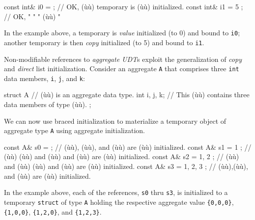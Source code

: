 \begin{emcppslisting}
const int& i0 = { };    // OK, (ù{}ù) temporary is (ù{}ù) initialized.
const int& i1 = { 5 };  // OK,       "           "       " (ù{}ù)      "
\end{emcppslisting}


\noindent In the example above, a temporary is \emph{value} initialized (to 0) and
bound to \lstinline!i0!; another temporary is then \emph{copy} initialized
(to 5) and bound to \lstinline!i1!.

Non-modifiable references to \emph{aggregate UDT}s exploit the
generalization of \emph{copy} and \emph{direct} list initialization.
Consider an aggregate \lstinline!A! that comprises three \lstinline!int! data
members, \lstinline!i!, \lstinline!j!, and \lstinline!k!:

\begin{emcppslisting}
struct A          // (ù{}ù) is an aggregate data type.
{
    int i, j, k;  // This (ù{}ù) contains three data members of type (ù{}ù).
};
\end{emcppslisting}


\noindent We can now use braced initialization to materialize a temporary object
of aggregate type \lstinline!A! using aggregate initialization.

\begin{emcppslisting}
const A& s0 = { };           // (ù{}ù), (ù{}ù), and (ù{}ù) are  (ù{}ù) initialized.
const A& s1 = { 1 };         // (ù{}ù) (ù{}ù) and (ù{}ù) and (ù{}ù) are (ù{}ù) initialized.
const A& s2 = { 1, 2 };      // (ù{}ù) and (ù{}ù) (ù{}ù) and (ù{}ù) are (ù{}ù) initialized.
const A& s3 = { 1, 2, 3 };   // (ù{}ù),(ù{}ù), and (ù{}ù) are (ù{}ù) initialized.
\end{emcppslisting}


In the example above, each of the references, \lstinline!s0! thru
\lstinline!s3!, is initialized to a temporary \lstinline!struct! of type
\lstinline!A! holding the respective aggregate value \lstinline!{0,0,0}!,
\lstinline!{1,0,0}!, \lstinline!{1,2,0}!, and \lstinline!{1,2,3}!.


